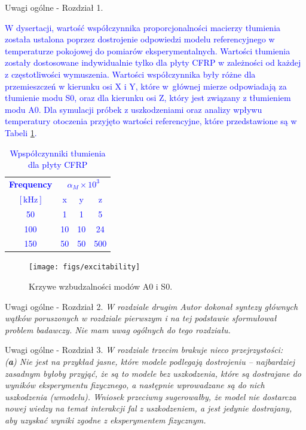 \documentclass[10pt,aspectratio=169]{beamer} %
\begin{document}
\begin{frame}[label=frame3]{Uwagi ogólne - Rozdział 1.}\justifying
\textcolor{blue}{W dysertacji, wartość współczynnika proporcjonalności macierzy tłumienia została ustalona poprzez dostrojenie odpowiedzi modelu referencyjnego w temperaturze pokojowej do pomiarów eksperymentalnych. Wartości tłumienia zostały dostosowane indywidualnie tylko dla płyty CFRP w zależności od każdej z częstotliwości wymuszenia. Wartości współczynnika były różne dla przemieszczeń w kierunku osi X i Y, które w~głównej mierze odpowiadają za tłumienie modu S0, oraz dla kierunku osi Z, który jest związany z tłumieniem modu A0. Dla symulacji próbek z uszkodzeniami oraz analizy wpływu temperatury otoczenia przyjęto wartości referencyjne, które przedstawione są w Tabeli \ref{tab:damp}.
\begin{table}[!hbt]
	\tabcolsep=0.1cm
	\centering
	\caption{\label{tab:damp} Wpspółczynniki tłumienia dla płyty CFRP}
	\begin{tabular}{cccc}
		\textbf{Frequency} & \multicolumn{3}{c}{\(\alpha_M\times 10^3\)} \\
		\([\mathrm{kHz}]\) & x & y & z\\\midrule
		50 & 1 & 1 & 5\\
		100 & 10 & 10 & 24\\
		150 & 50 & 50 & 500
	\end{tabular}
\end{table}
}
\end{frame}
\begin{frame}
	\begin{figure}
		\centering
		\caption{Krzywe wzbudzalności modów A0 i S0.}
		\texttt{[image: figs/excitability]}
		\label{fig:excitability}
	\end{figure}
\end{frame}
\begin{frame}[label=frame4]{Uwagi ogólne - Rozdział 2.}\justifying
\textit{W rozdziale drugim Autor dokonał syntezy głównych wątków poruszonych w rozdziale
pierwszym i na tej podstawie sformułował problem badawczy. Nie mam uwag ogólnych do tego rozdziału.}
\end{frame}
\begin{frame}[label=frame5]{Uwagi ogólne - Rozdział 3.}\justifying
\textit{W rozdziale trzecim brakuje nieco przejrzystości:\\
(\textbf{a}) Nie jest na przykład jasne, które modele podlegają dostrojeniu – najbardziej zasadnym byłoby przyjąć, że są to modele bez uszkodzenia, które są dostrajane do wyników eksperymentu fizycznego, a następnie wprowadzane są do nich uszkodzenia (wmodelu). Wniosek przeciwny sugerowałby, że model nie dostarcza nowej wiedzy na temat interakcji fal z uszkodzeniem, a jest jedynie dostrajany, aby uzyskać wyniki zgodne z eksperymentem fizycznym.}
\end{frame}
\end{document}
